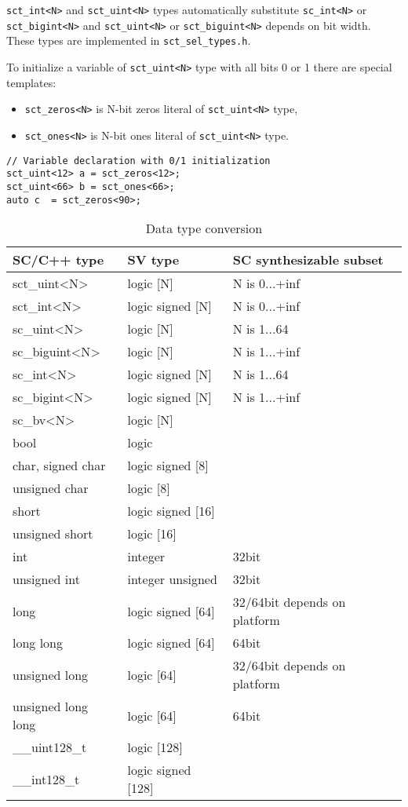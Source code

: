 {\tt sct\_int<N>} and {\tt sct\_uint<N>} types automatically substitute {\tt sc\_int<N>} or {\tt sct\_bigint<N>} and {\tt sct\_uint<N>} or {\tt sct\_biguint<N>} depends on bit width. These types are implemented in {\tt sct\_sel\_types.h}.

To initialize a variable of {\tt sct\_uint<N>} type with all bits 0 or 1 there are special templates:
\begin{itemize}
\item {\tt sct\_zeros<N>} is N-bit zeros literal of {\tt sct\_uint<N>} type,
\item {\tt sct\_ones<N>} is N-bit ones literal of {\tt sct\_uint<N>} type.
\end{itemize}

\begin{lstlisting}[style=mycpp]
// Variable declaration with 0/1 initialization
sct_uint<12> a = sct_zeros<12>;
sct_uint<66> b = sct_ones<66>;
auto c  = sct_zeros<90>;
\end{lstlisting}

\begin{table}
\begin{tabular}{|l|l|l|}
\hline
SC/C++ type & SV type  & SC synthesizable subset \\
\hline
sct\_uint<N> & logic [N] & N is 0...+inf \\
sct\_int<N> & logic signed [N] & N is 0...+inf \\
sc\_uint<N> & logic [N] & N is 1...64 \\
sc\_biguint<N> & logic [N] & N is 1...+inf \\
sc\_int<N> & logic signed [N] & N is 1...64 \\
sc\_bigint<N> & logic signed [N] & N is 1...+inf \\
sc\_bv<N> & logic [N] & \\
bool & logic & \\
char, signed char & logic signed [8] & \\
unsigned char & logic [8] & \\
short & logic signed [16] & \\
unsigned short & logic [16] & \\
int & integer & 32bit \\
unsigned int & integer unsigned & 32bit \\
long & logic signed [64] & 32/64bit depends on platform \\
long long & logic signed [64] & 64bit \\
unsigned long & logic [64] & 32/64bit depends on platform \\
unsigned long long & logic [64] & 64bit \\
\_\_uint128\_t & logic [128] & \\
\_\_int128\_t & logic signed [128] & \\
\hline
\end{tabular}
\caption{Data type conversion}
\label{tab:data_types}
\end{table}

